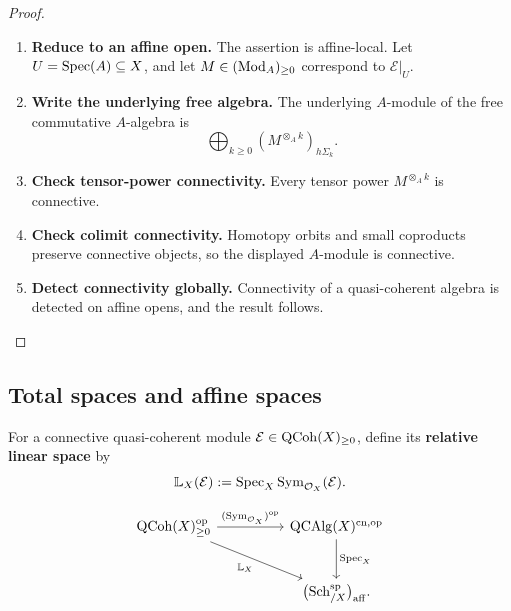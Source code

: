 \begin{proof}
\leavevmode
\begin{enumerate}[label=\textup{(\arabic*)}]
    \item \textbf{Reduce to an affine open.}
    The assertion is affine-local. Let $U=\operatorname{Spec}(A)\subseteq X$, and let
    $M\in(\operatorname{Mod}_{A})_{\geq0}$ correspond to $\mathcal E|_U$.

    \item \textbf{Write the underlying free algebra.}
    The underlying
    $A$-module of the free commutative $A$-algebra is
    \[
        \bigoplus_{k\geq0}
        \left(
            M^{\otimes_Ak}
        \right)_{h\Sigma_k}.
    \]

    \item \textbf{Check tensor-power connectivity.}
    Every tensor power $M^{\otimes_Ak}$ is connective.

    \item \textbf{Check colimit connectivity.}
    Homotopy orbits and
    small coproducts preserve connective objects, so the displayed
    $A$-module is connective.

    \item \textbf{Detect connectivity globally.}
    Connectivity of a quasi-coherent algebra is
    detected on affine opens, and the result follows.
\end{enumerate}
\end{proof}

\subsection{Total spaces and affine spaces}

\begin{definition}
\label{def:linear-spectral-space}
For a connective quasi-coherent module
$\mathcal E\in\operatorname{QCoh}(X)_{\geq0}$, define its \textbf{relative linear space} by
\[
    \mathbb L_X(\mathcal E)
    :=
    \operatorname{Spec}_X
    \operatorname{Sym}_{\mathcal O_X}(\mathcal E).
\]
\end{definition}

\[
\begin{tikzcd}[column sep=huge, row sep=large]
    \QCoh(X)_{\geq0}^{\op}
        \arrow[r, "{(\operatorname{Sym}_{\mathcal O_X})^{\op}}"]
        \arrow[dr, "{\mathbb L_X}"']
    &
    \operatorname{QCAlg}(X)^{\mathrm{cn},\op}
        \arrow[d, "{\Spec_X}"]
    \\
    &
    \bigl(\operatorname{Sch}^{\mathrm{sp}}_{/X}\bigr)_{\mathrm{aff}}.
\end{tikzcd}
\]


